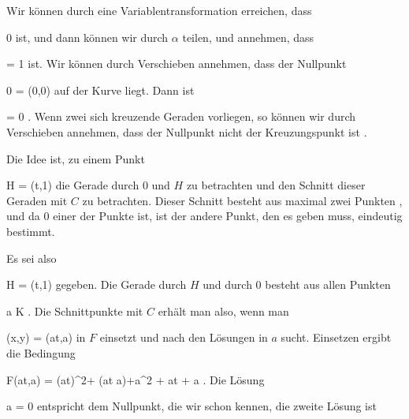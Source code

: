 {





Wir können durch eine Variablentransformation erreichen, dass

\mavergleichskette
{\vergleichskette
{ \alpha
}
{ \neq }{ 0
}
{  }{
}
{    }{
}
{   }{
}
}
{}{}{}
ist, und dann können wir durch $\alpha$ teilen, und annehmen, dass

\mavergleichskette
{\vergleichskette
{ \alpha
}
{ = }{ 1
}
{  }{
}
{    }{
}
{   }{
}
}
{}{}{}
ist. Wir können durch Verschieben annehmen, dass der Nullpunkt

\mavergleichskette
{\vergleichskette
{ 0
}
{ = }{ (0,0)
}
{  }{
}
{    }{
}
{   }{
}
}
{}{}{}
auf der Kurve liegt. Dann ist

\mavergleichskette
{\vergleichskette
{ \eta
}
{ = }{ 0
}
{  }{
}
{    }{
}
{   }{
}
}
{}{}{.}
Wenn zwei sich kreuzende Geraden vorliegen, so können wir durch Verschieben annehmen, dass der Nullpunkt nicht der Kreuzungspunkt ist
 {} {.}

Die Idee ist, zu einem Punkt

\mavergleichskette
{\vergleichskette
{ H
}
{ = }{ (t,1)
}
{  }{
}
{    }{
}
{   }{
}
}
{}{}{}
die Gerade durch $0$ und $H$ zu betrachten und den Schnitt dieser Geraden mit $C$ zu betrachten. Dieser Schnitt besteht aus maximal zwei Punkten
 {} {,}
und da $0$ einer der Punkte ist, ist der andere Punkt, den es geben muss, eindeutig bestimmt.

Es sei also

\mavergleichskette
{\vergleichskette
{ H
}
{ = }{ (t,1)
}
{  }{
}
{    }{
}
{   }{
}
}
{}{}{}
gegeben. Die Gerade durch $H$ und durch $0$ besteht aus allen Punkten

 {}
 {a \in K} {}
 {} {} {} {.}
Die Schnittpunkte mit $C$ erhält man also, wenn man

\mavergleichskette
{\vergleichskette
{ (x,y)
}
{ = }{ (at,a)
}
{  }{
}
{    }{
}
{   }{
}
}
{}{}{}
in $F$ einsetzt und nach den Lösungen in $a$ sucht. Einsetzen ergibt die Bedingung

\mavergleichskettedisp
{\vergleichskette
{ F(at,a)
}
{ =} { (at)^2+ \beta (at a)+\gamma a^2 + \delta at + \epsilon a
}
{ } {}
{ } {}
{ } {}
}
{}{}{.}
Die Lösung

\mavergleichskette
{\vergleichskette
{a
}
{ = }{ 0
}
{  }{
}
{    }{
}
{   }{
}
}
{}{}{}
entspricht dem Nullpunkt, die wir schon kennen, die zweite Lösung ist

}
